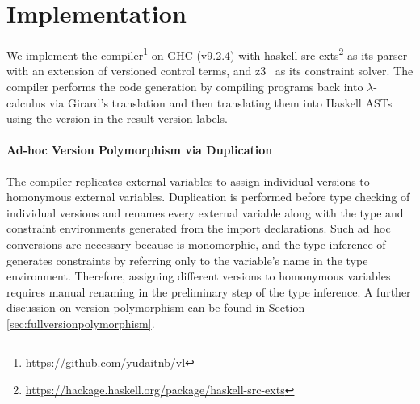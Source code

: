 
\section{Implementation}
\label{implementation} %


% 
We implement the \mylang{} compiler\footnote{\url{https://github.com/yudaitnb/vl}} on GHC (v9.2.4) with haskell-src-exts\footnote{\url{https://hackage.haskell.org/package/haskell-src-exts}} as its parser with an extension of versioned control terms, and z3~\cite{10.1007/978-3-540-78800-3_24} as its constraint solver.
The \mylang{} compiler performs the code generation by compiling \vlmini{} programs back into $\lambda$-calculus via Girard's translation and then translating them into Haskell ASTs using the version in the result version labels.

\paragraph{\textbf{Ad-hoc Version Polymorphism via Duplication}}
\label{sec:adhocversionpolymorphism}
The \mylang{} compiler replicates external variables to assign individual versions to homonymous external variables.
Duplication is performed before type checking of individual versions and renames every external variable along with the type and constraint environments generated from the import declarations.
Such ad hoc conversions are necessary because \vlmini{} is monomorphic, and the type inference of \vlmini{} generates constraints by referring only to the variable's name in the type environment.
Therefore, assigning different versions to homonymous variables requires manual renaming in the preliminary step of the type inference.
A further discussion on version polymorphism can be found in Section \ref{sec:fullversionpolymorphism}.

